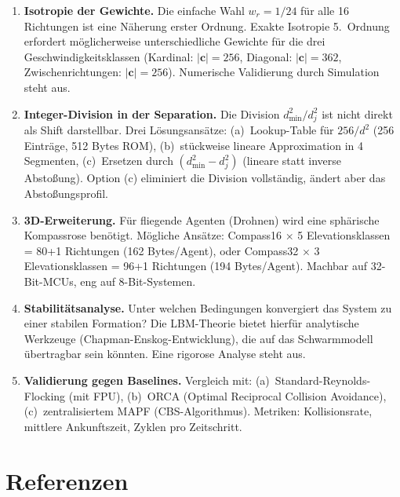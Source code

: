 \documentclass[11pt,a4paper]{article}
\begin{document}
\begin{enumerate}[itemsep=4pt]
\item \textbf{Isotropie der Gewichte.}
Die einfache Wahl $w_r = 1/24$ f\"ur alle 16 Richtungen
ist eine N\"aherung erster Ordnung.
Exakte Isotropie 5.\ Ordnung erfordert m\"oglicherweise
unterschiedliche Gewichte f\"ur die drei Geschwindigkeitsklassen
(Kardinal: $|\mathbf{c}| = 256$, Diagonal: $|\mathbf{c}| = 362$, Zwischenrichtungen: $|\mathbf{c}| = 256$).
Numerische Validierung durch Simulation steht aus.

\item \textbf{Integer-Division in der Separation.}
Die Division $d^2_{\min}/d^2_j$ ist nicht direkt als Shift darstellbar.
Drei L\"osungsans\"atze:
(a)~Lookup-Table f\"ur $256/d^2$ (256 Eintr\"age, 512 Bytes ROM),
(b)~st\"uckweise lineare Approximation in 4 Segmenten,
(c)~Ersetzen durch $(d^2_{\min} - d^2_j)$ (lineare statt inverse Absto\ss ung).
Option (c) eliminiert die Division vollst\"andig, \"andert aber das Absto\ss ungsprofil.

\item \textbf{3D-Erweiterung.}
F\"ur fliegende Agenten (Drohnen) wird eine sph\"arische Kompassrose ben\"otigt.
M\"ogliche Ans\"atze: Compass16 $\times$ 5 Elevationsklassen = 80+1 Richtungen (162 Bytes/Agent),
oder Compass32 $\times$ 3 Elevationsklassen = 96+1 Richtungen (194 Bytes/Agent).
Machbar auf 32-Bit-MCUs, eng auf 8-Bit-Systemen.

\item \textbf{Stabilit\"atsanalyse.}
Unter welchen Bedingungen konvergiert das System zu einer stabilen Formation?
Die LBM-Theorie bietet hierf\"ur analytische Werkzeuge
(Chapman-Enskog-Entwicklung), die auf das Schwarmmodell \"ubertragbar sein k\"onnten.
Eine rigorose Analyse steht aus.

\item \textbf{Validierung gegen Baselines.}
Vergleich mit: (a)~Standard-Reynolds-Flocking (mit FPU),
(b)~ORCA (Optimal Reciprocal Collision Avoidance),
(c)~zentralisiertem MAPF (CBS-Algorithmus).
Metriken: Kollisionsrate, mittlere Ankunftszeit, Zyklen pro Zeitschritt.
\end{enumerate}

\section*{Referenzen}
\end{document}
